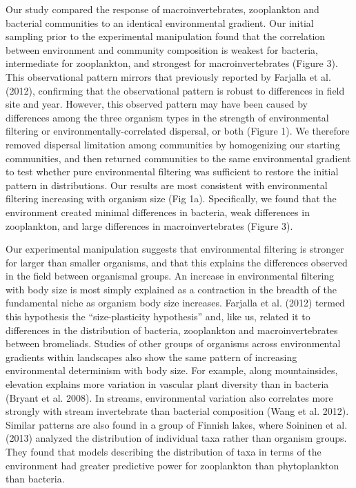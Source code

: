 \documentclass[12pt,]{article}
\begin{document}
Our study compared the response of macroinvertebrates, zooplankton and
bacterial communities to an identical environmental gradient. Our
initial sampling prior to the experimental manipulation found that the
correlation between environment and community composition is weakest for
bacteria, intermediate for zooplankton, and strongest for
macroinvertebrates (Figure 3). This observational pattern mirrors that
previously reported by Farjalla et al. (2012), confirming that the
observational pattern is robust to differences in field site and year.
However, this observed pattern may have been caused by differences among
the three organism types in the strength of environmental filtering or
environmentally-correlated dispersal, or both (Figure 1). We therefore
removed dispersal limitation among communities by homogenizing our
starting communities, and then returned communities to the same
environmental gradient to test whether pure environmental filtering was
sufficient to restore the initial pattern in distributions. Our results
are most consistent with environmental filtering increasing with
organism size (Fig 1a). Specifically, we found that the environment
created minimal differences in bacteria, weak differences in
zooplankton, and large differences in macroinvertebrates (Figure 3).

Our experimental manipulation suggests that environmental filtering is
stronger for larger than smaller organisms, and that this explains the
differences observed in the field between organismal groups. An increase
in environmental filtering with body size is most simply explained as a
contraction in the breadth of the fundamental niche as organism body
size increases. Farjalla et al. (2012) termed this hypothesis the
``size-plasticity hypothesis'' and, like us, related it to differences
in the distribution of bacteria, zooplankton and macroinvertebrates
between bromeliads. Studies of other groups of organisms across
environmental gradients within landscapes also show the same pattern of
increasing environmental determinism with body size. For example, along
mountainsides, elevation explains more variation in vascular plant
diversity than in bacteria (Bryant et al. 2008). In streams,
environmental variation also correlates more strongly with stream
invertebrate than bacterial composition (Wang et al. 2012). Similar
patterns are also found in a group of Finnish lakes, where Soininen et
al. (2013) analyzed the distribution of individual taxa rather than
organism groups. They found that models describing the distribution of
taxa in terms of the environment had greater predictive power for
zooplankton than phytoplankton than bacteria.
\end{document}
